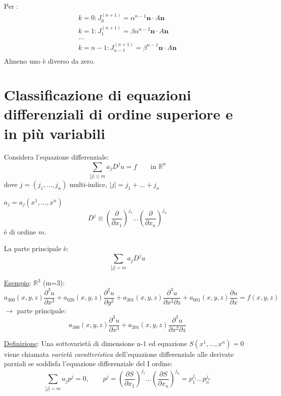 \documentclass[a4paper,11pt]{report}
\newcommand{\vect}[1]{\boldsymbol{#1}}
\newcommand{\R}{\mathbb{R}}
\newcommand{\Rn}{\mathbb{R}^n}
\begin{document}
Per :
\[
\begin{array}{l}
k=0 : J_0^{(n+1)} = \alpha^{n-1}\vect{n}\cdot A\vect{n}\\
k=1 : J_1^{(n+1)} = \beta\alpha^{n-2}\vect{n}\cdot A\vect{n}\\
\dots \\
k=n-1 : J_{n-1}^{(n+1)} = \beta^{n-1}\vect{n}\cdot A\vect{n}\\
\end{array}
\]
Almeno uno \`e diverso da zero.

\section{Classificazione di equazioni differenziali di ordine superiore e in pi\`u variabili}

Considera l'equazione differenziale:
\begin{equation}
\sum_{|j|\leq m}a_j D^j u = f \qquad \text{in } \Rn
\label{2.125}
\end{equation}
dove $ j=(j_1,\dots,j_n)$ multi-indice, $|j| = j_1 + \dots + j_n$

$a_j=a_j(x^1,\dots,x^n)$
\[
D^j \equiv \left(\frac{\partial}{\partial x_1}\right)^{j_1} \dots \left(\frac{\partial}{\partial x_n}\right)^{j_n}
\]
\`e di ordine $m$.

La parte principale \`e: 
\begin{equation}
\sum_{|j| = m} a_j D^j u 
\label{2.126}
\end{equation}

\medskip

\underline{Esempio}: $\R^3$ (m=3): 
\begin{equation}
a_{300}(x,y,z)\frac{\partial ^3 u}{\partial x^3} + a_{020}(x,y,z)\frac{\partial ^2 u}{\partial y^2} + a_{201}(x,y,z)\frac{\partial ^3 u}{\partial x^2\partial z} + a_{001}(x,y,z)\frac{\partial u}{\partial x} = f(x,y,z)
\tag{$*$}
\label{eq*}
\end{equation}
$\rightarrow$ parte principale:
\[
a_{300}(x,y,z)\frac{\partial ^3 u}{\partial x^3} + a_{201}(x,y,z)\frac{\partial ^3 u}{\partial x^2\partial z}
\]

\medskip

\underline{Definizione}: Una sottovariet\`a di dimensione n-1 ed equazione $S(x^1,\dots, x^n)=0$ viene chiamata \emph{variet\`a caratteristica} dell'equazione differenziale alle derivate parziali se soddisfa l'equazione differenziale del I ordine:
\begin{equation}
\sum_{|j| =m} a_j p^j=0 , \qquad p^j=\left(\frac{\partial S}{\partial x_1}\right)^{j_1} \dots \left(\frac{\partial S}{\partial x_n}\right)^{j_n} = p_1^{j_1} \dots p_n^{j_n} 
\label{2.127}
\end{equation}
\end{document}

